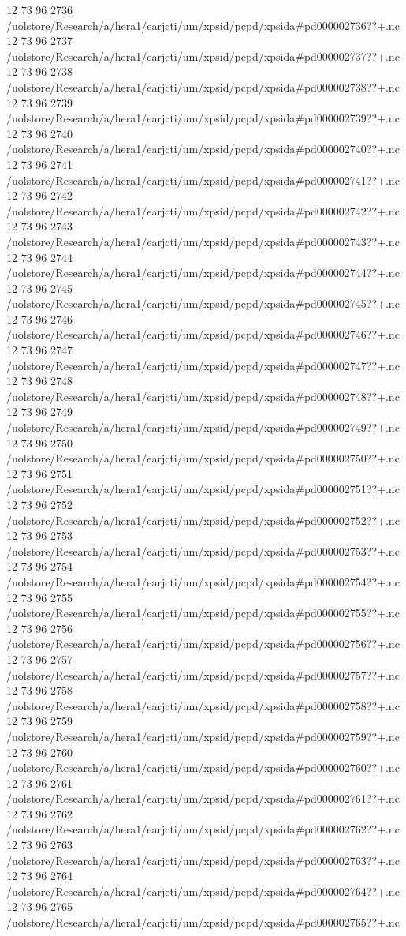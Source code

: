 12 73 96
2736
/uolstore/Research/a/hera1/earjcti/um/xpsid/pcpd/xpsida#pd000002736??+.nc
12 73 96
2737
/uolstore/Research/a/hera1/earjcti/um/xpsid/pcpd/xpsida#pd000002737??+.nc
12 73 96
2738
/uolstore/Research/a/hera1/earjcti/um/xpsid/pcpd/xpsida#pd000002738??+.nc
12 73 96
2739
/uolstore/Research/a/hera1/earjcti/um/xpsid/pcpd/xpsida#pd000002739??+.nc
12 73 96
2740
/uolstore/Research/a/hera1/earjcti/um/xpsid/pcpd/xpsida#pd000002740??+.nc
12 73 96
2741
/uolstore/Research/a/hera1/earjcti/um/xpsid/pcpd/xpsida#pd000002741??+.nc
12 73 96
2742
/uolstore/Research/a/hera1/earjcti/um/xpsid/pcpd/xpsida#pd000002742??+.nc
12 73 96
2743
/uolstore/Research/a/hera1/earjcti/um/xpsid/pcpd/xpsida#pd000002743??+.nc
12 73 96
2744
/uolstore/Research/a/hera1/earjcti/um/xpsid/pcpd/xpsida#pd000002744??+.nc
12 73 96
2745
/uolstore/Research/a/hera1/earjcti/um/xpsid/pcpd/xpsida#pd000002745??+.nc
12 73 96
2746
/uolstore/Research/a/hera1/earjcti/um/xpsid/pcpd/xpsida#pd000002746??+.nc
12 73 96
2747
/uolstore/Research/a/hera1/earjcti/um/xpsid/pcpd/xpsida#pd000002747??+.nc
12 73 96
2748
/uolstore/Research/a/hera1/earjcti/um/xpsid/pcpd/xpsida#pd000002748??+.nc
12 73 96
2749
/uolstore/Research/a/hera1/earjcti/um/xpsid/pcpd/xpsida#pd000002749??+.nc
12 73 96
2750
/uolstore/Research/a/hera1/earjcti/um/xpsid/pcpd/xpsida#pd000002750??+.nc
12 73 96
2751
/uolstore/Research/a/hera1/earjcti/um/xpsid/pcpd/xpsida#pd000002751??+.nc
12 73 96
2752
/uolstore/Research/a/hera1/earjcti/um/xpsid/pcpd/xpsida#pd000002752??+.nc
12 73 96
2753
/uolstore/Research/a/hera1/earjcti/um/xpsid/pcpd/xpsida#pd000002753??+.nc
12 73 96
2754
/uolstore/Research/a/hera1/earjcti/um/xpsid/pcpd/xpsida#pd000002754??+.nc
12 73 96
2755
/uolstore/Research/a/hera1/earjcti/um/xpsid/pcpd/xpsida#pd000002755??+.nc
12 73 96
2756
/uolstore/Research/a/hera1/earjcti/um/xpsid/pcpd/xpsida#pd000002756??+.nc
12 73 96
2757
/uolstore/Research/a/hera1/earjcti/um/xpsid/pcpd/xpsida#pd000002757??+.nc
12 73 96
2758
/uolstore/Research/a/hera1/earjcti/um/xpsid/pcpd/xpsida#pd000002758??+.nc
12 73 96
2759
/uolstore/Research/a/hera1/earjcti/um/xpsid/pcpd/xpsida#pd000002759??+.nc
12 73 96
2760
/uolstore/Research/a/hera1/earjcti/um/xpsid/pcpd/xpsida#pd000002760??+.nc
12 73 96
2761
/uolstore/Research/a/hera1/earjcti/um/xpsid/pcpd/xpsida#pd000002761??+.nc
12 73 96
2762
/uolstore/Research/a/hera1/earjcti/um/xpsid/pcpd/xpsida#pd000002762??+.nc
12 73 96
2763
/uolstore/Research/a/hera1/earjcti/um/xpsid/pcpd/xpsida#pd000002763??+.nc
12 73 96
2764
/uolstore/Research/a/hera1/earjcti/um/xpsid/pcpd/xpsida#pd000002764??+.nc
12 73 96
2765
/uolstore/Research/a/hera1/earjcti/um/xpsid/pcpd/xpsida#pd000002765??+.nc
